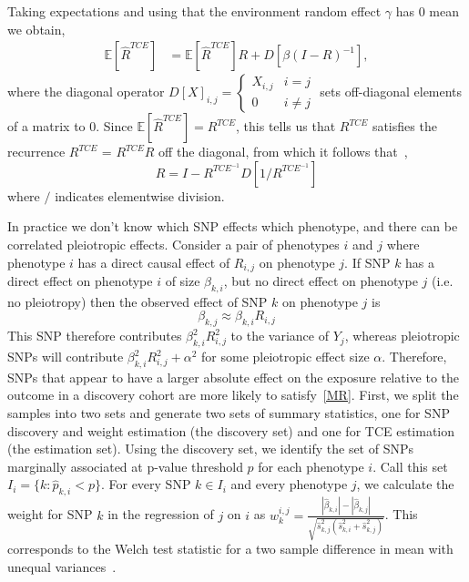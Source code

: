 \documentclass{article}
\begin{document}
Taking expectations and using that the environment random effect $\gamma$ has 0 mean we obtain,
\begin{align*}
\mathbb{E}[\hat{R}^{TCE}]  &= \mathbb{E}[\hat{R}^{TCE}] R + D[\beta (I-R)^{-1}],
\end{align*}
where the diagonal operator $D[X]_{i,j} = \left\{ \begin{array}{ll}
  X_{i,j} & i=j \\ 0 & i \neq j \end{array} \right.$ sets off-diagonal elements
  of a matrix to 0.
  Since $\mathbb{E}[\hat{R}^{TCE}] =R^{TCE}$,
this tells us that $R^{TCE}$ satisfies the recurrence
  $R^{TCE}$ = $R^{TCE} R$ off the diagonal, from
  which it follows that~\cite{Pachter},
\begin{equation}\label{r_cde}
R = I - R^{TCE^{-1}} D[1 / R^{TCE^{-1}}]
\end{equation}
where $/$ indicates elementwise division.

In practice we don't know which SNP effects which phenotype,
and there can be correlated pleiotropic effects.
Consider a pair of phenotypes $i$ and $j$ where phenotype $i$ has a direct causal
effect of $R_{i, j}$ on phenotype $j$. If SNP $k$ has a direct effect on phenotype $i$
of size $\beta_{k, i}$, but no direct effect on phenotype $j$ (i.e. no pleiotropy)
then the observed effect of SNP $k$ on phenotype $j$ is
\begin{equation}\label{MR}
\beta_{k,j} \approx \beta_{k,i} R_{i,j}
\end{equation}
This SNP therefore contributes
$\beta_{k, i}^2 R_{i, j}^2$ to the variance of $Y_j$, whereas
pleiotropic SNPs will contribute $\beta_{k, i}^2 R_{i, j}^2 + \alpha^2$
for some pleiotropic effect size $\alpha$. Therefore, SNPs that appear to
have a larger absolute effect on the exposure relative to the outcome in a discovery 
cohort are more likely to satisfy~\eqref{MR}.
First, we split the samples into two sets and generate two sets of summary statistics,
one for SNP discovery and weight estimation (the discovery set) and one for TCE estimation
(the estimation set). Using the discovery set, we identify the set of SNPs marginally
associated at p-value threshold $p$ for each phenotype $i$.
Call this set $I_i = \{k: \hat{p}_{k, i} < p\}$. For every SNP $k \in I_i$ and
every phenotype $j$, we calculate the weight for SNP $k$ in the regression of $j$ on $i$ as
$w^{i,j}_k = \frac{|\hat{\beta}_{k, i}| - |\hat{\beta}_{k, j}|}
  {\sqrt{\hat{s}_{k,j}^2 (\hat{s}^2_{k, i} + \hat{s}^2_{k, j})}}$.
This corresponds to the Welch test statistic for a two sample difference in mean with
unequal variances~\cite{Welch1947}.
  
\end{document}
